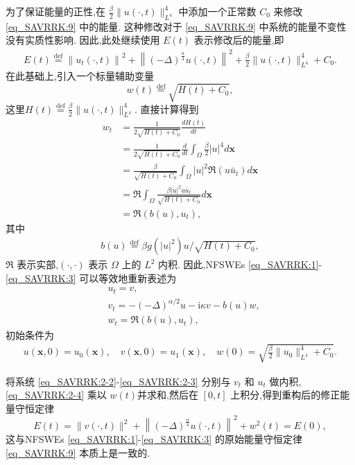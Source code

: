 为了保证能量的正性,在 $\frac{\beta}{2}\|u(\cdot, t)\|_{L^{4}}^{4}$ 中添加一个正常数 $C_0$ 来修改 \eqref{eq_SAVRRK:9} 中的能量.
这种修改对于 \eqref{eq_SAVRRK:9} 中系统的能量不变性没有实质性影响.
因此,此处继续使用 $E(t)$ 表示修改后的能量,即
\begin{align}\label{eq_SAVRRK:9_1}
	E(t)\overset{\text{def}}{=}\left\|u_{t}(\cdot, t)\right\|^{2}+\left\|(-\Delta)^{\frac{\alpha}{4}} u(\cdot, t)\right\|^{2}+\frac{\beta}{2}\|u(\cdot, t)\|_{L^{4}}^{4} + C_0.
\end{align}
在此基础上,引入一个标量辅助变量
\begin{equation}
	w(t)\overset{\text{def}}{=}\sqrt{H(t)+C_0},
\end{equation}
这里$H(t)\overset{\text{def}}{=}\frac{\beta}{2}\|u(\cdot, t)\|_{L^{4}}^{4} .$
直接计算得到
\begin{align}
	w_t & =\frac{1}{2 \sqrt{H(t)+C_0}} \frac{d H(t)}{d t} \nonumber\\
	& =\frac{1}{2 \sqrt{H(t)+C_0}} \frac{d}{d t} \int_{\Omega} \frac{\beta}{2}|u|^{4}d \boldsymbol{x} \nonumber\\
	& =\frac{\beta}{\sqrt{H(t)+C_0}} \int_{\Omega} |u|^2 \Re\left(u \bar{u}_t\right) d \boldsymbol{x}\nonumber\\
	& =\Re \int_{\Omega} \frac{\beta|u|^2 u \bar{u}_t}{\sqrt{H(t)+C_0}} d \boldsymbol{x} \nonumber\\
	& =\Re\left(b(u), u_t\right), \label{eq_SAVRRK:2-1}
\end{align}
其中
\begin{align}
b(u)\overset{\text{def}}{=}\beta g(|u|^2) u / \sqrt{H(t)+C_0},
\end{align}
$\Re$ 表示实部,$(\cdot, \cdot)$ 表示 $\Omega$ 上的 $L^2$ 内积.
因此,NFSWEs \eqref{eq_SAVRRK:1}-\eqref{eq_SAVRRK:3} 可以等效地重新表述为
\begin{align}
& u_t=v, \label{eq_SAVRRK:2-2}\\
& v_t=-(-\Delta)^{\alpha / 2} u-\mathrm{i}\kappa v-b(u) w, \label{eq_SAVRRK:2-3}\\
& w_t=\Re\left(b(u), u_t\right),\label{eq_SAVRRK:2-4}
\end{align}
初始条件为
\begin{align}\label{eq_SAVRRK:31}
	u(\boldsymbol{x}, 0)=u_{0}(\boldsymbol{x}), \quad v(\boldsymbol{x}, 0)=u_{1}(\boldsymbol{x}), \quad w(0)=\sqrt{\frac{\beta}{2}\|u_{0}\|_{L^{4}}^{4} +C_0}.
\end{align}

将系统 \eqref{eq_SAVRRK:2-2}-\eqref{eq_SAVRRK:2-3} 分别与 $v_t$ 和 $u_t$ 做内积, 
\eqref{eq_SAVRRK:2-4} 乘以 $w(t)$并求和,然后在 $[0, t]$ 上积分,得到重构后的修正能量守恒定律
\begin{equation}
E(t)=\|v(\cdot, t)\|^2+\left\|(-\Delta)^{\frac{\alpha}{4}} u(\cdot, t)\right\|^{2}+w^2(t)=E(0),
\end{equation}
这与NFSWEs \eqref{eq_SAVRRK:1}-\eqref{eq_SAVRRK:3} 的原始能量守恒定律 \eqref{eq_SAVRRK:9} 本质上是一致的.

